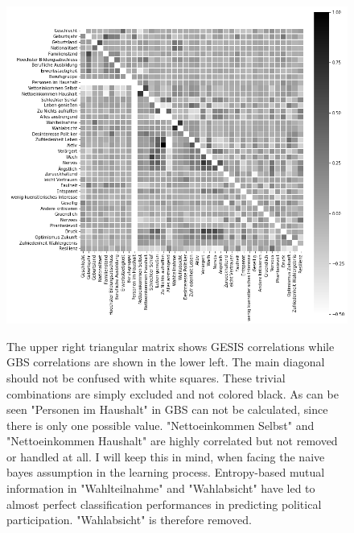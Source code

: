 \begin{appendices}
\begin{figure}[ht]
	\begin{center}
		\includegraphics[scale=0.73,angle=0]{fig/correl}
		\label{std}
		\caption{The upper right triangular matrix shows GESIS correlations while GBS correlations are shown in the lower left. The main diagonal should not be confused with white squares. These trivial combinations are simply excluded and not colored black. As can be seen "Personen im Haushalt" in GBS can not be calculated, since there is only one possible value. "Nettoeinkommen Selbst" and "Nettoeinkommen Haushalt" are highly correlated but not removed or handled at all. I will keep this in mind, when facing the naive bayes assumption in the learning process. Entropy-based mutual information in "Wahlteilnahme" and "Wahlabsicht" have led to almost perfect classification performances in predicting political participation. "Wahlabsicht" is therefore removed.}
	\end{center}
\end{figure}



\end{appendices}

